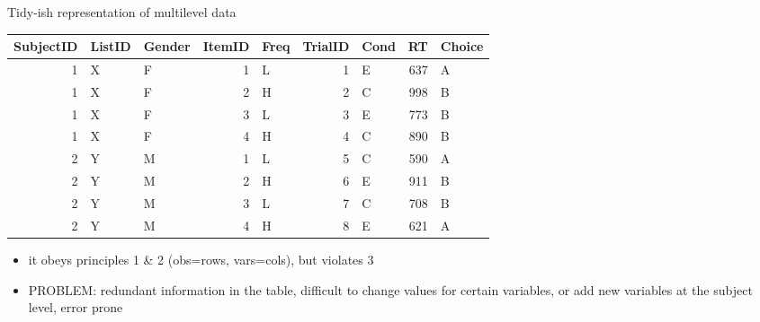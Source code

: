 \documentclass[presentation]{beamer}
\begin{document}
\begin{frame}[label={sec:orga617e56}]{Tidy-ish representation of multilevel data}
\begin{tiny}
\begin{center}
\begin{tabular}{rllrlrlrl}
\hline
SubjectID & ListID & Gender & ItemID & Freq & TrialID & Cond & RT & Choice\\
\hline
1 & X & F & 1 & L & 1 & E & 637 & A\\
1 & X & F & 2 & H & 2 & C & 998 & B\\
1 & X & F & 3 & L & 3 & E & 773 & B\\
1 & X & F & 4 & H & 4 & C & 890 & B\\
2 & Y & M & 1 & L & 5 & C & 590 & A\\
2 & Y & M & 2 & H & 6 & E & 911 & B\\
2 & Y & M & 3 & L & 7 & C & 708 & B\\
2 & Y & M & 4 & H & 8 & E & 621 & A\\
\hline
\end{tabular}
\end{center}
\end{tiny}

\begin{itemize}
\item it obeys principles 1 \& 2 (obs=rows, vars=cols), but violates 3
\item PROBLEM: redundant information in the table, difficult to change
values for certain variables, or add new variables at the subject
level, \alert{error prone}
\end{itemize}
\end{frame}
\end{document}
